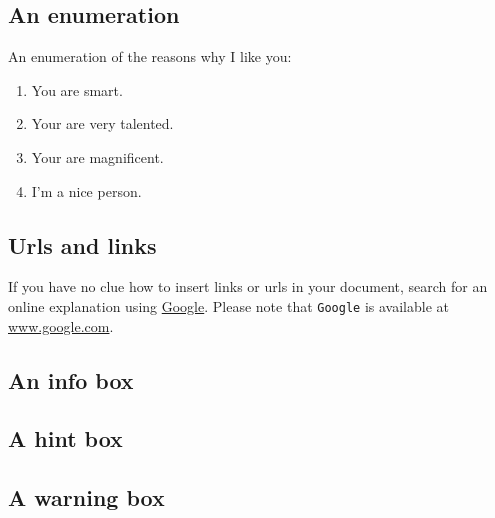 \documentclass{42-en}
\begin{document}
        \subsection{An enumeration}

            An enumeration of the reasons why I like you:\\

            \begin{enumerate}\itemsep7pt
                \item You are smart.
                \item Your are very talented.
                \item Your are magnificent.
                \item I'm a nice person.
            \end{enumerate}


        \subsection{Urls and links}

            If you have no clue how to insert links or urls in your
            document, search for an online explanation using
            \href{www.google.com}{Google}. Please note that \texttt{Google}
            is available at \url{www.google.com}.


        \newpage


        \subsection{An info box}



        \subsection{A hint box}



        \subsection{A warning box}



        \newpage
\end{document}

